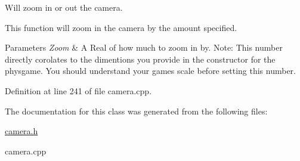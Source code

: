 Will zoom in or out the camera. 

This function will zoom in the camera by the amount specified. 
\begin{DoxyParams}{Parameters}
{\em Zoom} & A Real of how much to zoom in by. Note: This number directly corolates to the dimentions you provide in the constructor for the physgame. You should understand your games scale before setting this number. \\
\hline
\end{DoxyParams}


Definition at line 241 of file camera.cpp.



The documentation for this class was generated from the following files:\begin{DoxyCompactItemize}
\item 
\hyperlink{camera_8h}{camera.h}\item 
camera.cpp\end{DoxyCompactItemize}
